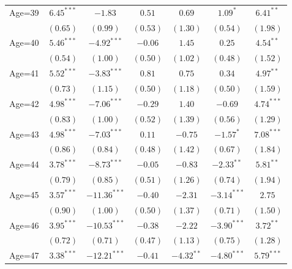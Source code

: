 \documentclass[fullpage]{paper}
\begin{document}
\begin{center}
\begin{longtable}{l c c c c c c }
Age=39      & $6.45^{***}$  & $-1.83$        & $0.51$        & $0.69$         & $1.09^{*}$     & $6.41^{**}$   \\
            & $(0.65)$      & $(0.99)$       & $(0.53)$      & $(1.30)$       & $(0.54)$       & $(1.98)$      \\
Age=40      & $5.46^{***}$  & $-4.92^{***}$  & $-0.06$       & $1.45$         & $0.25$         & $4.54^{**}$   \\
            & $(0.54)$      & $(1.00)$       & $(0.50)$      & $(1.02)$       & $(0.48)$       & $(1.52)$      \\
Age=41      & $5.52^{***}$  & $-3.83^{***}$  & $0.81$        & $0.75$         & $0.34$         & $4.97^{**}$   \\
            & $(0.73)$      & $(1.15)$       & $(0.50)$      & $(1.18)$       & $(0.50)$       & $(1.59)$      \\
Age=42      & $4.98^{***}$  & $-7.06^{***}$  & $-0.29$       & $1.40$         & $-0.69$        & $4.74^{***}$  \\
            & $(0.83)$      & $(1.00)$       & $(0.52)$      & $(1.39)$       & $(0.56)$       & $(1.29)$      \\
Age=43      & $4.98^{***}$  & $-7.03^{***}$  & $0.11$        & $-0.75$        & $-1.57^{*}$    & $7.08^{***}$  \\
            & $(0.86)$      & $(0.84)$       & $(0.48)$      & $(1.42)$       & $(0.67)$       & $(1.84)$      \\
Age=44      & $3.78^{***}$  & $-8.73^{***}$  & $-0.05$       & $-0.83$        & $-2.33^{**}$   & $5.81^{**}$   \\
            & $(0.79)$      & $(0.85)$       & $(0.51)$      & $(1.26)$       & $(0.74)$       & $(1.94)$      \\
Age=45      & $3.57^{***}$  & $-11.36^{***}$ & $-0.40$       & $-2.31$        & $-3.14^{***}$  & $2.75$        \\
            & $(0.90)$      & $(1.00)$       & $(0.50)$      & $(1.37)$       & $(0.71)$       & $(1.50)$      \\
Age=46      & $3.95^{***}$  & $-10.53^{***}$ & $-0.38$       & $-2.22$        & $-3.90^{***}$  & $3.72^{**}$   \\
            & $(0.72)$      & $(0.71)$       & $(0.47)$      & $(1.13)$       & $(0.75)$       & $(1.28)$      \\
Age=47      & $3.38^{***}$  & $-12.21^{***}$ & $-0.41$       & $-4.32^{**}$   & $-4.80^{***}$  & $5.79^{***}$  \\

\end{longtable}
\end{center}
\end{document}
